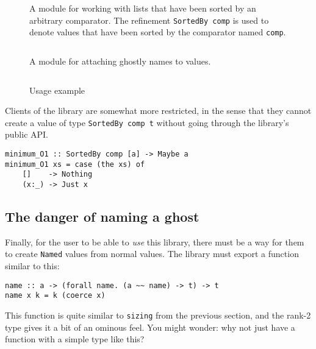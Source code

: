 \documentclass[format=sigplan, review=false, screen=true]{acmart}
\begin{document}

\begin{figure}
  \inputminted{haskell}{ordered.hs}
  \caption{A module for working with lists that have been sorted by an arbitrary
    comparator. The refinement \texttt{SortedBy comp} is used to denote values that
    have been sorted by the comparator named \texttt{comp}.}
\end{figure}


\begin{figure}
  \inputminted{haskell}{named.hs}
  \caption{A module for attaching ghostly names to values.\label{name-module}}
\end{figure}

\begin{figure}
  \inputminted{haskell}{usageO.hs}
  \caption{Usage example}
  \end{figure}
Clients of the library are somewhat more restricted, in the sense that they cannot create a
value of type \texttt{SortedBy comp t} without going through the library's public API.

\begin{verbatim}
minimum_O1 :: SortedBy comp [a] -> Maybe a
minimum_O1 xs = case (the xs) of
    []    -> Nothing
    (x:_) -> Just x
\end{verbatim}

\subsection{The danger of naming a ghost}

Finally, for the user to be able to \emph{use} this library, there must be a way for
them to create \texttt{Named} values from normal values. The library must export a
function similar to this:

\begin{verbatim}
name :: a -> (forall name. (a ~~ name) -> t) -> t
name x k = k (coerce x)
\end{verbatim}

This function is quite similar to \texttt{sizing} from the previous section, and the rank-2
type gives it a bit of an ominous feel. You might wonder: why not just have a function
with a simple type like this?
\end{document}
